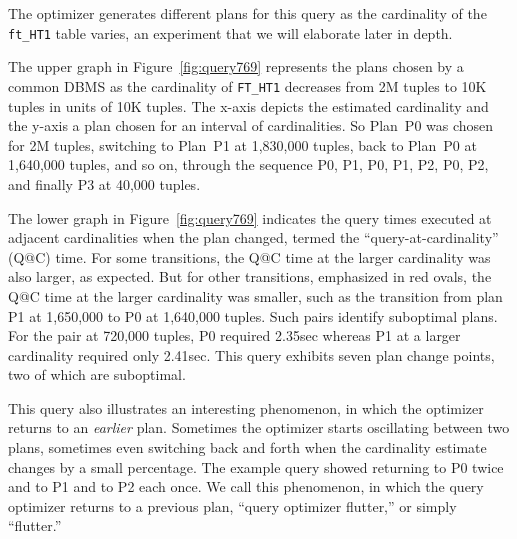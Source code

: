 \documentclass[prodmode,acmtods]{acmsmall}
\begin{document}
\noindent
\hspace{3ex}{\small\begin{verbatim}
        SELECT t0.id1, t0.id2, t2.id4, t1.id1 
        FROM ft_HT3 t2, ft_HT2 t1, ft_HT1 t0 
        WHERE (t2.id4=t1.id1 AND t2.id1=t0.id1)
\end{verbatim}
}

\noindent
The optimizer generates
different plans for this query as the cardinality of the {\tt
  ft\_HT1} table varies, an experiment that we will elaborate later in depth.

The upper graph in Figure~\ref{fig:query769} represents the plans chosen by
a common DBMS as the cardinality of {\tt FT\_HT1} decreases from 2M tuples
to 10K tuples in units of 10K tuples. The \hbox{x-axis} depicts the estimated
cardinality and the y-axis  a plan chosen for an interval of
cardinalities. So Plan~P0 was chosen for 2M tuples, switching to Plan~P1 at
1,830,000 tuples, back to Plan~P0 at 1,640,000 tuples, and so on, through the
sequence P0, P1, P0, P1, P2, P0, P2, and finally P3 at 40,000 tuples.

The lower graph in Figure~\ref{fig:query769} indicates the query times
executed at adjacent cardinalities when the plan changed, termed the
``query-at-cardinality'' (Q@C) time. For some transitions, the Q@C time at
the larger cardinality was also larger, as expected. But for other
transitions, emphasized in red ovals, the Q@C time at the larger cardinality
was smaller, such as the transition from plan P1 at 1,650,000 to P0 at 1,640,000
tuples. Such pairs identify suboptimal plans. For the pair at 720,000
tuples, P0 required 2.35sec whereas P1 at a larger cardinality required only
2.41sec. This query exhibits seven plan change points, two of which are suboptimal.

This query also illustrates an interesting phenomenon, in which the
optimizer returns to an {\em earlier} plan. Sometimes the
optimizer starts oscillating between two plans, sometimes even switching
back and forth when the cardinality estimate changes by a small
percentage. The example query showed returning to P0 twice and to P1 and to
P2 each once.
We call this phenomenon, in which
the query optimizer returns to a previous plan,
``query optimizer flutter,'' or simply ``flutter.'' 
\end{document}
